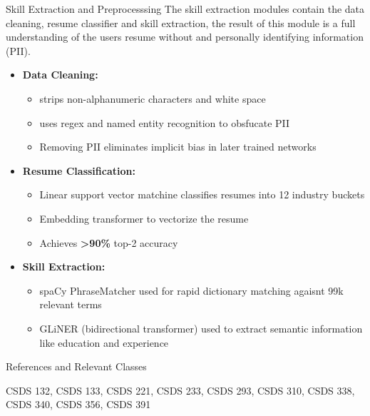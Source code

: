 \documentclass[final]{beamer}
\newlength{\colwidth}
\begin{document}
\begin{frame}[t]
\begin{columns}[t]
\begin{column}{\colwidth}
\begin{alertblock}{Skill Extraction and Preprocesssing}
    The skill extraction modules contain the data cleaning, resume classifier and skill extraction, the result of this module is a full understanding of the users resume without and personally identifying information (PII).

    \begin{itemize}
      \item \textbf{Data Cleaning:}
          \begin{itemize}
              \item strips non-alphanumeric characters and white space
              \item uses regex and named entity recognition to obsfucate PII
              \item Removing PII eliminates implicit bias in later trained networks
            \end{itemize}

      \item \textbf{Resume Classification:}  

          \begin{itemize}
              \item Linear support vector matchine classifies resumes into 12 industry buckets
              \item Embedding transformer to vectorize the resume
              \item Achieves \textbf{>90\%} top-2 accuracy 
            \end{itemize}
      \item \textbf{Skill Extraction:} 
          \begin{itemize}
              \item spaCy PhraseMatcher used for rapid dictionary matching agaisnt 99k relevant terms
                \item GLiNER (bidirectional transformer) used to extract semantic information like education and experience
          \end{itemize}
  \end{itemize}
    

  \end{alertblock}

  \begin{block}{References and Relevant Classes}

      CSDS 132, CSDS 133, CSDS 221, CSDS 233, CSDS 293, CSDS 310, CSDS 338, CSDS 340, CSDS 356, CSDS 391

    \nocite{*}
    \footnotesize{}


\end{block}
\end{column}
\end{columns}
\end{frame}
\end{document}
